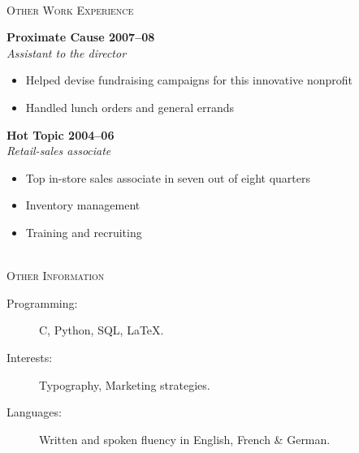\documentclass[11pt]{article}
\newcommand{\linehead}[1]	%
	{\vspace{5mm} 
	{\color{cvColour}
	\hrulefill \\ 
	{\large 
	\textsc{{#1}}}}}
\newcommand{\bighead}[1]	%
	{\vspace{5mm} 
	{\large 
	{\textbf {#1}}}}
\newcommand{\ithead}[1]		%
	{{\large 
	{\textit {#1}}}}
\begin{document}
\linehead{Other Work Experience}

\bighead{Proximate Cause \hfill 2007–08} \\
\ithead{Assistant to the director}
\begin{itemize}
    \item Helped devise fundraising campaigns for this innovative nonprofit
    \item Handled lunch orders and general errands
\end{itemize}

\bighead{Hot Topic \hfill 2004–06} \\
\ithead{Retail-sales associate}
\begin{itemize}
    \item Top in-store sales associate in seven out of eight quarters
    \item Inventory management
    \item Training and recruiting
\end{itemize}



\linehead{Other Information}
\begin{description}
\item[Programming:] C, Python, SQL, \LaTeX.
\item[Interests:] Typography, Marketing strategies.
\item[Languages:] Written and spoken fluency in English, French \& German.
\end{description}
\end{document}

